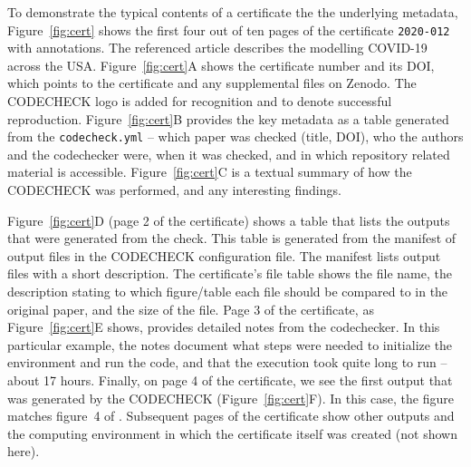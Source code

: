 \documentclass[12pt]{article}
\begin{document}
To demonstrate the typical contents of a certificate the the underlying
metadata, 
Figure~\ref{fig:cert} shows the first four out of ten
pages of the certificate \texttt{2020-012} \cite{cert-2020-012} with
annotations.
The referenced article \cite{unwin_report_2020} describes the modelling COVID-19
across the USA.
Figure~\ref{fig:cert}A shows the certificate number and its DOI,
which points to the certificate and any supplemental files on Zenodo.
The CODECHECK logo is
added for recognition and to denote successful reproduction.
Figure~\ref{fig:cert}B provides the key metadata as a table generated
from the \texttt{codecheck.yml} --
which paper was checked (title, DOI), who the authors and the codechecker 
were, when it was checked, and in which repository related material is
accessible.
Figure~\ref{fig:cert}C is a textual summary of how the CODECHECK was
performed, and any interesting findings.

Figure~\ref{fig:cert}D (page 2 of the certificate) shows a table that
lists the outputs that were generated from the check.
This table is generated from the manifest of output files in the CODECHECK
configuration file. The manifest lists output files with a short description.
The certificate's file table shows the file name, the description stating to
which figure/table each file should be compared to in the original paper, and
the size of the file.
Page 3 of the certificate,
as Figure~\ref{fig:cert}E shows, provides detailed notes from the
codechecker. In this particular example, the notes document what steps were 
needed to initialize the environment and run the code, and that the execution
took quite long to run -- about 17 hours.  Finally, on page 4 of
the certificate, we see the first output that was generated by the
CODECHECK (Figure~\ref{fig:cert}F).  In this case, the figure matches
figure~4 of \cite{unwin_report_2020}.
Subsequent pages of the certificate show other outputs and the computing
environment in which the certificate itself was created (not shown here).
\end{document}
